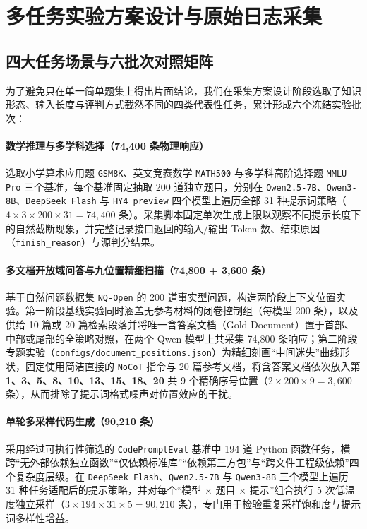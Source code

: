 \section{多任务实验方案设计与原始日志采集}\label{sec:collection}

\subsection{四大任务场景与六批次对照矩阵}

为了避免只在单一简单题集上得出片面结论，我们在采集方案设计阶段选取了知识形态、输入长度与评判方式截然不同的四类代表性任务，累计形成六个冻结实验批次：

\paragraph{数学推理与多学科选择（74,400 条物理响应）}选取小学算术应用题 \texttt{GSM8K}、英文竞赛数学 \texttt{MATH500} 与多学科高阶选择题 \texttt{MMLU-Pro} 三个基准，每个基准固定抽取 200 道独立题目，分别在 \texttt{Qwen2.5-7B}、\texttt{Qwen3-8B}、\texttt{DeepSeek Flash} 与 \texttt{HY4 preview} 四个模型上遍历全部 31 种提示词策略（$4\times 3\times 200\times 31 = 74{,}400$ 条）。采集脚本固定单次生成上限以观察不同提示长度下的自然截断现象，并完整记录接口返回的输入/输出 Token 数、结束原因（\texttt{finish\_reason}）与源判分结果。

\paragraph{多文档开放域问答与九位置精细扫描（74,800 + 3,600 条）}基于自然问题数据集 \texttt{NQ-Open} 的 200 道事实型问题，构造两阶段上下文位置实验。第一阶段基线实验同时涵盖无参考材料的闭卷控制组（每模型 200 条），以及供给 10 篇或 20 篇检索段落并将唯一含答案文档（Gold Document）置于首部、中部或尾部的全策略对照，在两个 Qwen 模型上共采集 74,800 条响应；第二阶段专题实验（\texttt{configs/document\_positions.json}）为精细刻画“中间迷失”曲线形状，固定使用简洁直接的 \texttt{NoCoT} 指令与 20 篇参考文档，将含答案文档依次放入第 \textbf{1、3、5、8、10、13、15、18、20} 共 9 个精确序号位置（$2\times 200\times 9 = 3{,}600$ 条），从而排除了提示词格式噪声对位置效应的干扰。

\paragraph{单轮多采样代码生成（90,210 条）}采用经过可执行性筛选的 \texttt{CodePromptEval} 基准中 194 道 Python 函数任务，横跨“无外部依赖独立函数”“仅依赖标准库”“依赖第三方包”与“跨文件工程级依赖”四个复杂度层级。在 \texttt{DeepSeek Flash}、\texttt{Qwen2.5-7B} 与 \texttt{Qwen3-8B} 三个模型上遍历 31 种任务适配后的提示策略，并对每个“模型 $\times$ 题目 $\times$ 提示”组合执行 5 次低温度独立采样（$3\times 194\times 31\times 5 = 90{,}210$ 条），专门用于检验重复采样饱和度与提示词多样性增益。

